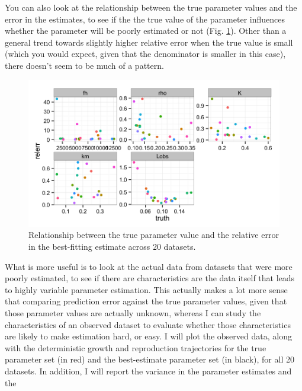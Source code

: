 \documentclass[12pt,reqno,final,pdftex]{amsart}\usepackage[]{graphicx}\usepackage[]{color}
\newenvironment{knitrout}{}{} %
\theoremstyle{plain}
\numberwithin{equation}{part}
\begin{document}
You can also look at the relationship between the true parameter values and the error in the estimates, to see if the the true value of the parameter influences whether the parameter will be poorly estimated or not (Fig. \ref{fig:truth-est-corr}).
Other than a general trend towards slightly higher relative error when the true value is small (which you would expect, given that the denominator is smaller in this case), there doesn't seem to be much of a pattern.

\begin{knitrout}\scriptsize
{}\color{fgcolor}\begin{figure}

\includegraphics[width=\linewidth]{figure/truth-est-corr-1} \hfill{}

\caption[Relationship between the true parameter value and the relative error in the best-fitting estimate across 20 datasets]{Relationship between the true parameter value and the relative error in the best-fitting estimate across 20 datasets.}\label{fig:truth-est-corr}
\end{figure}


\end{knitrout}

What is more useful is to look at the actual data from datasets that were more poorly estimated, to see if there are characteristics are the data itself that leads to highly variable parameter estimation.
This actually makes a lot more sense that comparing prediction error against the true parameter values, given that those parameter values are actually unknown, whereas I can study the characteristics of an observed dataset to evaluate whether those characteristics are likely to make estimation hard, or easy.
I will plot the observed data, along with the deterministic growth and reproduction trajectories for the true parameter set (in red) and the best-estimate parameter set (in black), for all 20 datasets.
In addition, I will report the variance in the parameter estimates and the
\end{document}
